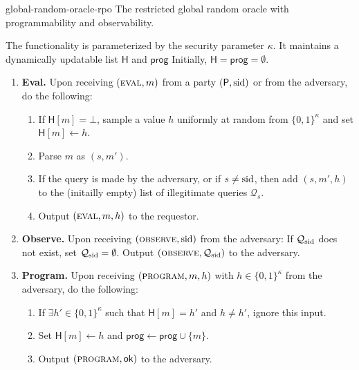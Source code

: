 \begin{cccFunctionality}
      {\funcGrpoRO}
      {global-random-oracle-rpo}
      {The restricted global random oracle with programmability and observability.}

      The functionality is parameterized by the security parameter $\kappa$.
      It maintains a dynamically updatable list $\mathsf{H}$ and $\mathsf{prog}$
      Initially, $\mathsf{H} = \mathsf{prog} = \emptyset$.

      \begin{enumerate}[label=\FlatSteel, leftmargin=*, nosep]
            \item \textbf{Eval.} Upon receiving $(\textsc{eval}, m)$ from a party $(\mathsf{P}, \mathrm{sid})$ or from the adversary, do the following:
                  \begin{enumerate}[label=\arabic*., leftmargin=*, nosep]
                        \item If $\mathsf{H}[m] = \bot$, sample a value $h$ uniformly at random from $\{0, 1\}^\kappa$ and set $\mathsf{H}[m] \gets h$.
                        \item Parse $m$ as $(s, m')$.
                        \item If the query is made by the adversary, or if $s \neq \mathrm{sid}$, then add $(s, m', h)$ to the (initailly empty) list of illegitimate queries $\mathcal{Q}_s$.
                        \item Output $(\textsc{eval}, m, h)$ to the requestor.
                  \end{enumerate}

            \item \textbf{Observe.} Upon receiving $(\textsc{observe}, \mathrm{sid})$ from the adversary: If $\mathcal{Q}_\mathrm{sid}$ does not exist, set $\mathcal{Q}_\mathrm{sid} = \emptyset$. Output $(\textsc{observe}, \mathcal{Q}_\mathrm{sid})$ to the adversary.

            \item \textbf{Program.} Upon receiving $(\textsc{program}, m, h)$ with $h \in \{0, 1\}^\kappa$ from the adversary, do the following:
                  \begin{enumerate}[label=\arabic*., leftmargin=*, nosep]
                        \item If $\exists h' \in \{0, 1\}^\kappa$ such that $\mathsf{H}[m] = h'$ and $h \neq h'$, ignore this input.
                        \item Set $\mathsf{H}[m] \gets h$ and $\mathsf{prog} \gets \mathsf{prog} \cup \{ m \}$.
                        \item Output $(\textsc{program}, \mathsf{ok})$ to the adversary.
                  \end{enumerate}


\end{enumerate}
\end{cccFunctionality}
